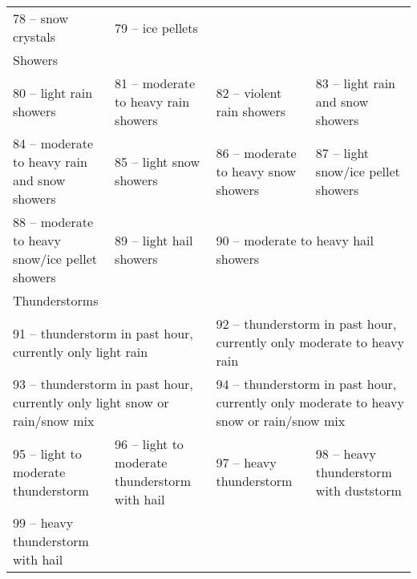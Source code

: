 \documentclass{article}
\begin{document}
\begin{description}
\begin{description}
\begin{landscape}
{\begin{tabular}{llll}
        78 -- snow crystals&79 -- ice pellets & & \\
        \multicolumn{4}{l}{Showers}\\
        80 -- light rain showers&81 -- moderate to heavy rain showers&82 -- violent rain showers&83 -- light rain and snow showers\\
        84 -- moderate to heavy rain and snow showers&85 -- light snow showers&86 -- moderate to heavy snow showers&87 -- light snow/ice pellet showers\\
        88 -- moderate to heavy snow/ice pellet showers&89 -- light hail showers&\multicolumn{2}{l}{90 -- moderate to heavy hail showers}\\
        \multicolumn{4}{l}{Thunderstorms}\\
        \multicolumn{2}{l}{91 -- thunderstorm in past hour, currently only light rain}&\multicolumn{2}{l}{92 -- thunderstorm in past hour, currently only moderate to heavy rain}\\
        \multicolumn{2}{l}{93 -- thunderstorm in past hour, currently only light snow or rain/snow mix}&\multicolumn{2}{l}{94 -- thunderstorm in past hour, currently only moderate to heavy snow or rain/snow mix}\\
        95 -- light to moderate thunderstorm&96 -- light to moderate thunderstorm with hail&97 -- heavy thunderstorm&98 -- heavy thunderstorm with duststorm\\
        99 -- heavy thunderstorm with hail & & &\\
      \end{tabular}
    }
\end{landscape}
\newpage
{}
 \setcounter{page}{6}
\end{description}
\end{description}
\end{document}
